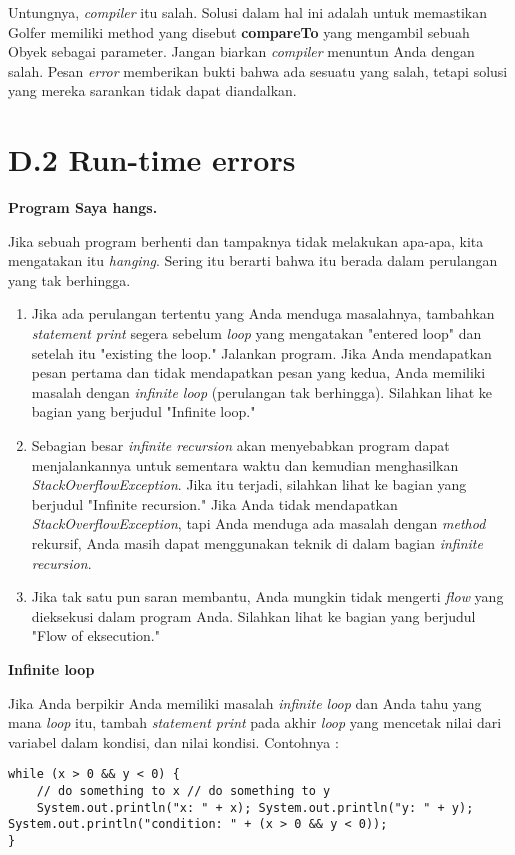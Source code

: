 \noindent Untungnya, \textit{compiler} itu salah. Solusi dalam hal ini adalah untuk memastikan Golfer memiliki method yang disebut \textbf{compareTo} yang mengambil sebuah Obyek sebagai parameter.
Jangan biarkan \textit{compiler} menuntun Anda dengan salah. Pesan \textit{error} memberikan bukti bahwa ada sesuatu yang salah, tetapi solusi yang mereka sarankan tidak dapat diandalkan.

\section{D.2 Run-time errors}

\noindent \textbf{Program Saya hangs.}

\noindent Jika sebuah program berhenti dan tampaknya tidak melakukan apa-apa, kita mengatakan itu \textit{hanging}. Sering itu berarti bahwa itu berada dalam perulangan yang tak berhingga.
\begin{enumerate}
    \item Jika ada perulangan tertentu yang Anda menduga masalahnya, tambahkan \textit{statement print} segera sebelum \textit{loop} yang mengatakan "entered loop" dan setelah itu "existing the loop." Jalankan program. Jika Anda mendapatkan pesan pertama dan tidak mendapatkan pesan yang kedua, Anda memiliki masalah dengan \textit{infinite loop} (perulangan tak berhingga). Silahkan lihat ke bagian yang berjudul "Infinite loop."
    \item Sebagian besar \textit{infinite recursion} akan menyebabkan program dapat menjalankannya untuk sementara waktu dan kemudian menghasilkan \textit{StackOverflowException}. Jika itu terjadi, silahkan lihat ke bagian yang berjudul "Infinite recursion." Jika Anda tidak mendapatkan \textit{StackOverflowException}, tapi Anda menduga ada masalah dengan \textit{method} rekursif, Anda masih dapat menggunakan teknik di dalam bagian \textit{infinite recursion}.
    \item Jika tak satu pun saran membantu, Anda mungkin tidak mengerti \textit{flow} yang dieksekusi dalam program Anda. Silahkan lihat ke bagian yang berjudul "Flow of eksecution."
\end{enumerate}

\noindent \textbf{Infinite loop}

\noindent Jika Anda berpikir Anda memiliki masalah \textit{infinite loop} dan Anda tahu yang mana \textit{loop} itu, tambah \textit{statement print} pada akhir \textit{loop} yang mencetak nilai dari variabel dalam kondisi, dan nilai kondisi.
Contohnya : 
\begin{lstlisting}
while (x > 0 && y < 0) { 
    // do something to x // do something to y
    System.out.println("x: " + x); System.out.println("y: " + y); System.out.println("condition: " + (x > 0 && y < 0));
}
\end{lstlisting}

